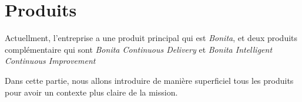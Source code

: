 \section{Produits}
Actuellment, l'entreprise a une produit principal qui est \emph{Bonita}, et deux produits complémentaire qui sont \textit{Bonita Continuous Delivery} et \textit{Bonita Intelligent Continuous Improvement}

Dans cette partie, nous allons introduire de manière superficiel tous les produits pour avoir un contexte plus claire de la mission.




